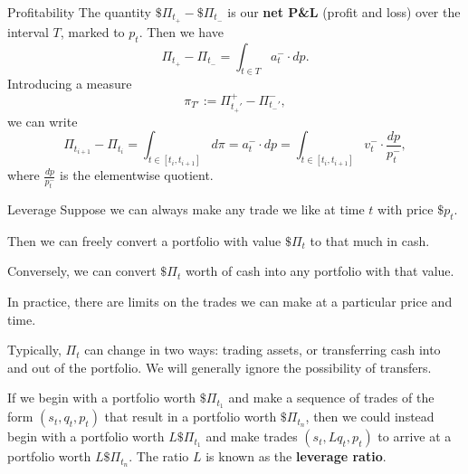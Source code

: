 \documentclass{beamer}
\begin{document}
\begin{frame}{Profitability}
	The quantity $\$\Pi_{t_+} - \$\Pi_{t_-}$ is our \textbf{net P\&L} (profit and loss) over the interval $T$, marked to $p_t$.
	Then we have
	$$\Pi_{t_+} - \Pi_{t_-} = \int_{t\in T} a_t^- \cdot dp.$$
	Introducing a measure
	$$\pi_{T'} := \Pi_{t_+'}^+ - \Pi_{t_-'}^-,$$
	we can write
	$$\Pi_{t_{i+1}} - \Pi_{t_i} = \int_{t\in [t_i, t_{i+1}]} d\pi = a_t^- \cdot dp = \int_{t\in [t_i, t_{i+1}]} v_t^- \cdot \frac{dp}{p_t^-},$$
	where $\frac{dp}{p_t^-}$ is the elementwise quotient.
\end{frame}

\begin{frame}{Leverage}
	Suppose we can always make any trade we like at time $t$ with price $\$p_t$.

	Then we can freely convert a portfolio with value $\$\Pi_t$ to that much in cash.

	Conversely, we can convert $\$\Pi_t$ worth of cash into any portfolio with that value.

	In practice, there are limits on the trades we can make at a particular price and time.

	\pause

	Typically, $\Pi_t$ can change in two ways: trading assets, or transferring cash into and out of the portfolio. We will generally ignore the possibility of transfers.

	\pause

	If we begin with a portfolio worth $\$\Pi_{t_1}$ and make a sequence of trades of the form $(s_t,q_t,p_t)$ that result in a portfolio worth $\$\Pi_{t_n}$, then we could instead begin with a portfolio worth $L \$\Pi_{t_1}$ and make trades $(s_t, L q_t, p_t)$ to arrive at a portfolio worth $L \$\Pi_{t_n}$. The ratio $L$ is known as the \textbf{leverage ratio}.
\end{frame}
\end{document}
